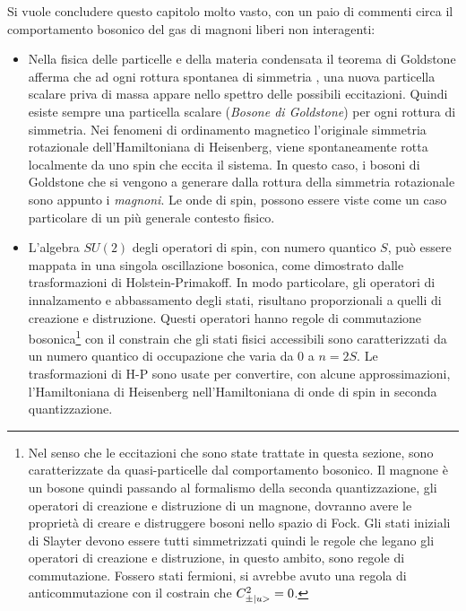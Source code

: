 Si vuole concludere questo capitolo molto vasto, con  un paio di commenti circa il comportamento bosonico del gas di magnoni liberi non interagenti:
\begin{itemize}
	\item Nella fisica delle particelle e della materia condensata il teorema di Goldstone afferma che ad ogni rottura spontanea di simmetria , una nuova particella scalare priva di massa appare nello spettro delle possibili eccitazioni. Quindi esiste sempre una particella scalare (\textit{Bosone di Goldstone})  per ogni rottura di simmetria. Nei fenomeni di ordinamento magnetico l'originale simmetria rotazionale dell'Hamiltoniana di Heisenberg, viene spontaneamente rotta localmente da uno spin che eccita il sistema. In questo caso, i bosoni di Goldstone che si vengono a generare dalla rottura della simmetria rotazionale sono appunto i \textit{magnoni}. Le onde di spin, possono essere viste come un caso particolare di un pi\`u generale contesto fisico.

	\item L'algebra $SU(2)$ degli operatori di spin, con numero quantico $S$, pu\`o essere mappata in una singola oscillazione bosonica, come dimostrato dalle trasformazioni di Holstein-Primakoff. In modo particolare, gli operatori di innalzamento e abbassamento degli stati, risultano proporzionali a quelli di creazione e distruzione. Questi operatori hanno regole di commutazione bosonica\footnote{Nel senso che le eccitazioni che sono state trattate in questa sezione, sono caratterizzate da quasi-particelle dal comportamento bosonico. Il magnone \`e un bosone quindi passando al formalismo della seconda quantizzazione, gli operatori di creazione e distruzione di un magnone, dovranno avere le propriet\`a di creare e distruggere bosoni nello spazio di Fock. Gli stati iniziali di Slayter devono essere tutti simmetrizzati quindi le regole che legano gli operatori di creazione e distruzione, in questo ambito, sono regole di commutazione. Fossero stati fermioni, si avrebbe avuto una regola di anticommutazione con il costrain che $C_{\pm\ket{u} }^2  = 0$.} 
con il constrain che gli stati fisici accessibili sono caratterizzati da un numero quantico di occupazione che varia da $0$ a $n = 2S$. Le trasformazioni di H-P sono usate per convertire, con alcune approssimazioni, l'Hamiltoniana di Heisenberg nell'Hamiltoniana di onde di spin in seconda quantizzazione.
\end{itemize}



